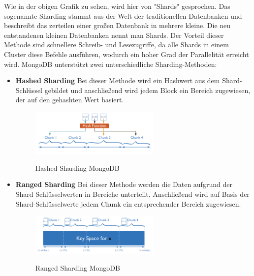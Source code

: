 Wie in der obigen Grafik zu sehen, wird hier von "Shards" gesprochen. Das sogenannte Sharding stammt aus der Welt der traditionellen Datenbanken und beschreibt das zerteilen einer großen Datenbank in mehrere kleine. Die neu entstandenen kleinen Datenbanken nennt man Shards. Der Vorteil dieser Methode sind schnellere Schreib- und Lesezugriffe, da alle Shards in einem Cluster diese Befehle ausführen, wodurch ein hoher Grad der Parallelität erreicht wird.
\newline
MongoDB unterstützt zwei unterschiedliche Sharding-Methoden:
\begin{itemize}
    \item \textbf{Hashed Sharding}
        \newline
        Bei dieser Methode wird ein Hashwert aus dem Shard-Schlüssel gebildet und anschließend wird jedem Block ein Bereich zugewiesen, der auf den gehashten Wert basiert.
        \begin{figure}[h!]
            \centering
            \includegraphics[width=0.6\textwidth]{pics/hashed_sharding.png}
            \caption{Hashed Sharding MongoDB}
            \cite{hashed_sharding_image}
            \label{fig:enter-label}
        \end{figure}
    \item \textbf{Ranged Sharding}
        \newline
        Bei dieser Methode werden die Daten aufgrund der Shard Schlüsselwerten in Bereiche unterteilt. Anschließend wird auf Basis der Shard-Schlüsselwerte  jedem Chunk ein entsprechender Bereich zugewiesen.
        \begin{figure}[h!]
            \centering
            \includegraphics[width=0.6\textwidth]{pics/ranged_sharding.png}
            \caption{Ranged Sharding MongoDB}
            \cite{range_sharding_image}
            \label{fig:enter-label}
        \end{figure}
\end{itemize}